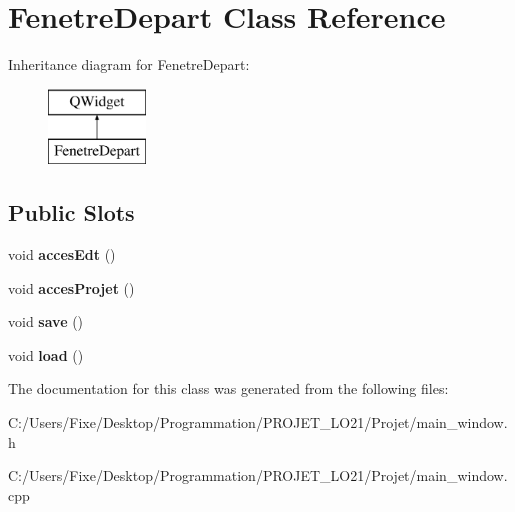\hypertarget{class_fenetre_depart}{}\section{Fenetre\+Depart Class Reference}
\label{class_fenetre_depart}
Inheritance diagram for Fenetre\+Depart\+:\begin{figure}[H]
\begin{center}
\leavevmode
\includegraphics[height=2.000000cm]{class_fenetre_depart}
\end{center}
\end{figure}
\subsection*{Public Slots}
\begin{DoxyCompactItemize}
\item 
\hypertarget{class_fenetre_depart_a1faa801c1a677047b0cc2f8b21bef2b7}{}void {\bfseries acces\+Edt} ()\label{class_fenetre_depart_a1faa801c1a677047b0cc2f8b21bef2b7}

\item 
\hypertarget{class_fenetre_depart_a1c7c37f13e0b1fcdb75144f4bad0717b}{}void {\bfseries acces\+Projet} ()\label{class_fenetre_depart_a1c7c37f13e0b1fcdb75144f4bad0717b}

\item 
\hypertarget{class_fenetre_depart_ae8d2affd9c03d8639d8b48cc03f38846}{}void {\bfseries save} ()\label{class_fenetre_depart_ae8d2affd9c03d8639d8b48cc03f38846}

\item 
\hypertarget{class_fenetre_depart_abb7599840f9937ac15e9a69fd5e91873}{}void {\bfseries load} ()\label{class_fenetre_depart_abb7599840f9937ac15e9a69fd5e91873}

\end{DoxyCompactItemize}


The documentation for this class was generated from the following files\+:\begin{DoxyCompactItemize}
\item 
C\+:/\+Users/\+Fixe/\+Desktop/\+Programmation/\+P\+R\+O\+J\+E\+T\+\_\+\+L\+O21/\+Projet/main\+\_\+window.\+h\item 
C\+:/\+Users/\+Fixe/\+Desktop/\+Programmation/\+P\+R\+O\+J\+E\+T\+\_\+\+L\+O21/\+Projet/main\+\_\+window.\+cpp\end{DoxyCompactItemize}

